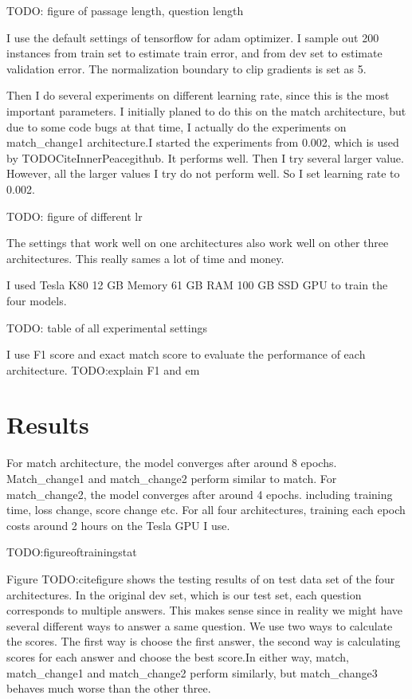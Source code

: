 \documentclass[modernstyle,12pt]{sjsuthesis}
\theoremstyle{definition}
\begin{document}
TODO: figure of passage length, question length

I use the default settings of tensorflow for adam optimizer. I sample out 200 instances from train set to estimate train error, and from dev set to estimate validation error. The normalization boundary to clip gradients is set as 5.

Then I do several experiments on different learning rate, since this is the most important parameters. I initially planed to do this on the match architecture, but due to some code bugs at that time, I actually do the experiments on match\_change1 architecture.I started the experiments from 0.002, which is used by TODOCiteInnerPeacegithub. It performs well. Then I try several larger value. However, all the larger values I try do not perform well. So I set learning rate to 0.002.

TODO: figure of different lr


The settings that work well on one architectures also work well on other three architectures. This really sames a lot of time and money.

I used Tesla K80 12 GB Memory 61 GB RAM 100 GB SSD GPU to train the four models.

TODO: table of all experimental settings

I use F1 score and exact match score to evaluate the performance of each architecture. TODO:explain F1 and em


\section{Results}

For match architecture, the model converges after around 8 epochs. Match\_change1 and match\_change2 perform similar to match. For match\_change2, the model converges after around 4 epochs.  including training time, loss change, score change etc. For all four architectures, training each epoch costs around 2 hours on the Tesla GPU I use.

TODO:figureoftrainingstat

Figure TODO:citefigure shows the testing results of on test data set of the four architectures. In the original dev set, which is our test set, each question corresponds to multiple answers. This makes sense since in reality we might have several different ways to answer a same question. We use two ways to calculate the scores. The first way is choose the first answer, the second way is calculating scores for each answer and choose the best score.In either way, match, match\_change1 and match\_change2 perform similarly, but match\_change3 behaves much worse than the other three.
\end{document}
